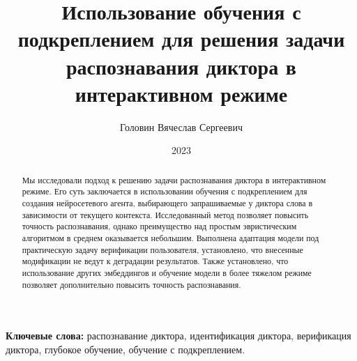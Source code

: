 \documentclass[14pt]{spbau-diploma}
\author{Головин Вячеслав Сергеевич}
\title{Использование обучения с подкреплением для решения задачи распознавания
диктора в интерактивном режиме}
\date{2023}
\begin{document}

\maketitle

\begin{abstract}
    Мы исследовали подход к решению задачи распознавания диктора в интерактивном
    режиме. Его суть заключается в использовании обучения с подкреплением для
    создания нейросетевого агента, выбирающего запрашиваемые у диктора слова
    в зависимости от текущего контекста. Исследованный метод позволяет повысить
    точность распознавания, однако преимущество над простым эвристическим
    алгоритмом в среднем оказывается небольшим. Выполнена адаптация модели под
    практическую задачу верификации пользователя, установлено, что внесенные
    модификации не ведут к деградации результатов. Также установлено, что
    использование других эмбеддингов и обучение модели в более тяжелом режиме
    позволяет дополнительно повысить точность распознавания.
\end{abstract}

\textbf{Ключевые слова:} распознавание диктора, идентификация диктора,
верификация диктора, глубокое обучение, обучение с подкреплением.
\end{document}
